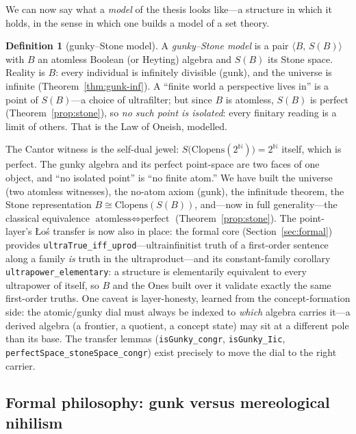 \documentclass[]{article}
\theoremstyle{definition}
\newtheorem{definition}[theorem]{Definition}
\theoremstyle{remark}
\newcommand{\code}[1]{\texttt{#1}}
\newcommand{\N}{\mathbb{N}}
\begin{document}
We can now say what a \emph{model} of the thesis looks like---a structure in which it
holds, in the sense in which one builds a model of a set theory.

\begin{definition}[gunky--Stone model]
\label{def:model}
A \emph{gunky--Stone model} is a pair $\langle B,\,S(B)\rangle$ with $B$ an atomless
Boolean (or Heyting) algebra and $S(B)$ its Stone space. Reality is $B$: every
individual is infinitely divisible (gunk), and the universe is infinite
(Theorem~\ref{thm:gunk-inf}). A ``finite world a perspective lives in'' is a point of
$S(B)$---a choice of ultrafilter; but since $B$ is atomless, $S(B)$ is perfect
(Theorem~\ref{prop:stone}), so \emph{no such point is isolated}: every finitary
reading is a limit of others. That is the Law of Oneish, modelled.
\end{definition}

The Cantor witness is the self-dual jewel: $S\bigl(\mathrm{Clopens}(2^{\N})\bigr)=2^{\N}$
itself, which is perfect. The gunky algebra and its perfect point-space are two faces
of one object, and ``no isolated point'' is ``no finite atom.'' We have built the
universe (two atomless witnesses), the no-atom axiom (gunk), the infinitude theorem,
the Stone representation $B\cong\mathrm{Clopens}(S(B))$, and---now in full
generality---the classical equivalence $\text{atomless}\Leftrightarrow\text{perfect}$
(Theorem~\ref{prop:stone}). The point-layer's {\L}o\'s transfer is now also in place:
the formal core (Section~\ref{sec:formal}) provides
\code{ultraTrue\_iff\_uprod}---ultrainfinitist truth of a first-order sentence along a
family \emph{is} truth in the ultraproduct---and its constant-family corollary
\code{ultrapower\_elementary}: a structure is elementarily equivalent to every
ultrapower of itself, so $B$ and the Ones built over it validate exactly the same
first-order truths. One caveat is layer-honesty, learned from the concept-formation
side: the atomic/gunky dial must always be indexed to \emph{which} algebra carries
it---a derived algebra (a frontier, a quotient, a concept state) may sit at a
different pole than its base. The transfer lemmas (\code{isGunky\_congr},
\code{isGunky\_Iic}, \code{perfectSpace\_stoneSpace\_congr}) exist precisely to move
the dial to the right carrier.

\subsection{Formal philosophy: gunk versus mereological nihilism}
\label{sec:sider}
\end{document}
